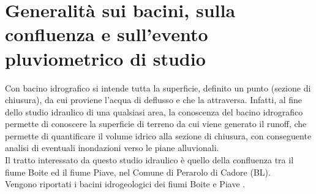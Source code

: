 \section{Generalità sui bacini, sulla confluenza e sull'evento pluviometrico di studio}
\label{section:evento_pluviometrico}
Con bacino idrografico si intende tutta la superficie, definito un punto (sezione di chiusura), da cui proviene l'acqua di deflusso e che la attraversa. Infatti, al fine dello studio idraulico di una qualsiasi area, la conoscenza del bacino idrografico permette di conoscere la superficie di terreno da cui viene generato il runoff, che permette di quantificare il volume idrico alla sezione di chiusura, con conseguente analisi di eventuali inondazioni verso le piane alluvionali.\\
Il tratto interessato da questo studio idraulico è quello della confluenza tra il fiume Boite ed il fiume Piave, nel Comune di Perarolo di Cadore (BL).\\
Vengono riportati i bacini idrogeologici dei fiumi Boite \cite{fiume_boite} e Piave \cite{fiume_piave}.
